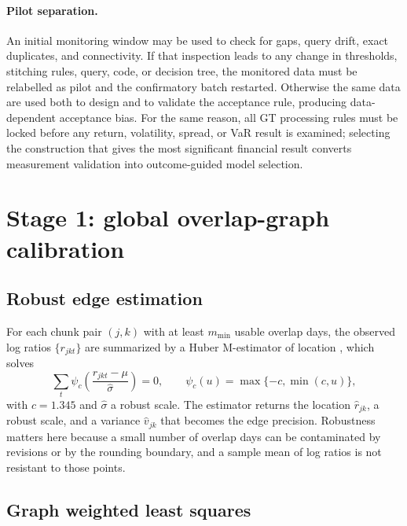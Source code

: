 \documentclass[12pt,a4paper,oneside]{article}
\begin{document}
\paragraph{Pilot separation.} An initial monitoring window may be used to check
for gaps, query drift, exact duplicates, and connectivity. If that inspection
leads to any change in thresholds, stitching rules, query, code, or decision
tree, the monitored data must be relabelled as pilot and the confirmatory batch
restarted. Otherwise the same data are used both to design and to validate the
acceptance rule, producing data-dependent acceptance bias. For the same reason,
all GT processing rules must be locked before any return, volatility, spread, or
VaR result is examined; selecting the construction that gives the most
significant financial result converts measurement validation into
outcome-guided model selection.

\section{Stage 1: global overlap-graph calibration}\label{sec:calibration}

\subsection{Robust edge estimation}

For each chunk pair $(j,k)$ with at least $m_{\min}$ usable overlap days, the
observed log ratios $\{r_{jkt}\}$ are summarized by a Huber M-estimator of
location \citep{Huber1964}, which solves
\begin{equation}
\sum_{t} \psi_c\!\left(\frac{r_{jkt} - \mu}{\hat{\sigma}}\right) = 0,
\qquad
\psi_c(u) = \max\{-c, \min(c, u)\},
\label{eq:huber}
\end{equation}
with $c = 1.345$ and $\hat{\sigma}$ a robust scale. The estimator returns the
location $\hat{r}_{jk}$, a robust scale, and a variance $\hat{v}_{jk}$ that
becomes the edge precision. Robustness matters here because a small number of
overlap days can be contaminated by revisions or by the rounding boundary, and a
sample mean of log ratios is not resistant to those points.

\subsection{Graph weighted least squares}
\end{document}
